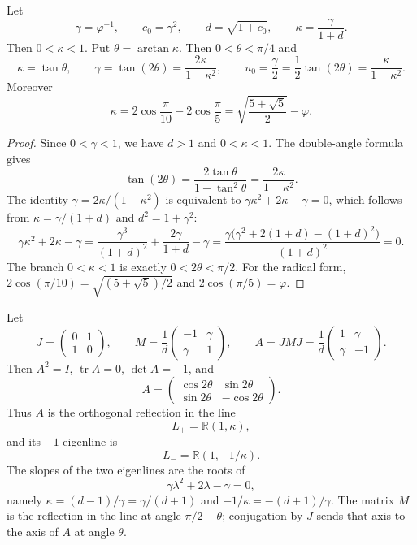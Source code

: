 \begin{lemma}\label{lem:half-angle}
Let
\[
\gamma=\varphi^{-1},\qquad c_0=\gamma^2,\qquad d=\sqrt{1+c_0},
\qquad \kappa=\frac{\gamma}{1+d}.
\]
Then \(0<\kappa<1\). Put \(\theta=\arctan\kappa\). Then \(0<\theta<\pi/4\) and
\[
\kappa=\tan\theta,\qquad
\gamma=\tan(2\theta)=\frac{2\kappa}{1-\kappa^2},
\qquad
u_0=\frac{\gamma}{2}=\frac12\tan(2\theta)=\frac{\kappa}{1-\kappa^2}.
\]
Moreover
\[
\kappa=2\cos\frac{\pi}{10}-2\cos\frac{\pi}{5}
=\sqrt{\frac{5+\sqrt5}{2}}-\varphi.
\]
\end{lemma}

\begin{proof}
Since \(0<\gamma<1\), we have \(d>1\) and \(0<\kappa<1\). The double-angle formula gives
\[
\tan(2\theta)=\frac{2\tan\theta}{1-\tan^2\theta}
=\frac{2\kappa}{1-\kappa^2}.
\]
The identity \(\gamma=2\kappa/(1-\kappa^2)\) is equivalent to \(\gamma\kappa^2+2\kappa-\gamma=0\), which follows from \(\kappa=\gamma/(1+d)\) and \(d^2=1+\gamma^2\):
\[
\gamma\kappa^2+2\kappa-\gamma
=\frac{\gamma^3}{(1+d)^2}+\frac{2\gamma}{1+d}-\gamma
=\frac{\gamma\bigl(\gamma^2+2(1+d)-(1+d)^2\bigr)}{(1+d)^2}=0.
\]
The branch \(0<\kappa<1\) is exactly \(0<2\theta<\pi/2\). For the radical form, \(2\cos(\pi/10)=\sqrt{(5+\sqrt5)/2}\) and \(2\cos(\pi/5)=\varphi\).
\end{proof}

\begin{lemma}\label{lem:reflection}
Let
\[
J=\begin{pmatrix}0&1\\1&0\end{pmatrix},
\qquad
M=\frac1d\begin{pmatrix}-1&\gamma\\ \gamma&1\end{pmatrix},
\qquad
A=JMJ=\frac1d\begin{pmatrix}1&\gamma\\ \gamma&-1\end{pmatrix}.
\]
Then \(A^2=I\), \(\operatorname{tr}A=0\), \(\det A=-1\), and
\[
A=
\begin{pmatrix}
\cos 2\theta&\sin 2\theta\\
\sin 2\theta&-\cos 2\theta
\end{pmatrix}.
\]
Thus \(A\) is the orthogonal reflection in the line
\[
L_+=\mathbb R(1,\kappa),
\]
and its \(-1\) eigenline is
\[
L_-=\mathbb R(1,-1/\kappa).
\]
The slopes of the two eigenlines are the roots of
\[
\gamma\lambda^2+2\lambda-\gamma=0,
\]
namely \(\kappa=(d-1)/\gamma=\gamma/(d+1)\) and \(-1/\kappa=-(d+1)/\gamma\). The matrix \(M\) is the reflection in the line at angle \(\pi/2-\theta\); conjugation by \(J\) sends that axis to the axis of \(A\) at angle \(\theta\).
\end{lemma}


